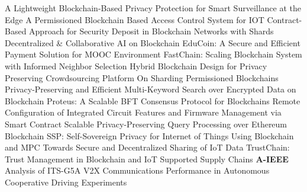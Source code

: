  \cite{fitwi_lightweight_2019} A {{Lightweight Blockchain}}-{{Based Privacy Protection}} for {{Smart Surveillance}} at the {{Edge}} \newline 
 \cite{islam_permissioned_2019} A {{Permissioned Blockchain Based Access Control System}} for {{IOT}} \newline 
 \cite{li_contract-based_2019} Contract-{{Based Approach}} for {{Security Deposit}} in {{Blockchain Networks}} with {{Shards}} \newline 
 \cite{harris_decentralized_2019} Decentralized \& {{Collaborative AI}} on {{Blockchain}} \newline 
 \cite{lu_educoin_2019} {{EduCoin}}: A {{Secure}} and {{Efficient Payment Solution}} for {{MOOC Environment}} \newline 
 \cite{wang_fastchain_2019} {{FastChain}}: {{Scaling Blockchain System}} with {{Informed Neighbor Selection}} \newline 
 \cite{zhu_hybrid_2019} Hybrid {{Blockchain Design}} for {{Privacy Preserving Crowdsourcing Platform}} \newline 
 \cite{amiri_sharding_2019} On {{Sharding Permissioned Blockchains}} \newline 
 \cite{jiang_privacy-preserving_2019} Privacy-{{Preserving}} and {{Efficient Multi}}-{{Keyword Search}} over {{Encrypted Data}} on {{Blockchain}} \newline 
 \cite{jalalzai_proteus_2019} Proteus: {{A Scalable BFT Consensus Protocol}} for {{Blockchains}} \newline 
 \cite{islam_remote_2019} Remote {{Configuration}} of {{Integrated Circuit Features}} and {{Firmware Management}} via {{Smart Contract}} \newline 
 \cite{linoy_scalable_2019} Scalable {{Privacy}}-{{Preserving Query Processing}} over {{Ethereum Blockchain}} \newline 
 \cite{kim_ssp_2019} {{SSP}}: {{Self}}-{{Sovereign Privacy}} for {{Internet}} of {{Things Using Blockchain}} and {{MPC}} \newline 
 \cite{truong_towards_2019} Towards {{Secure}} and {{Decentralized Sharing}} of {{IoT Data}} \newline 
 \cite{malik_trustchain_2019} {{TrustChain}}: {{Trust Management}} in {{Blockchain}} and {{IoT Supported Supply Chains}} \newline 
\textbf{A-IEEE} \newline  \cite{parra_analysis_2017} Analysis of {{ITS}}-{{G5A V2X}} Communications Performance in Autonomous Cooperative Driving Experiments \newline 
